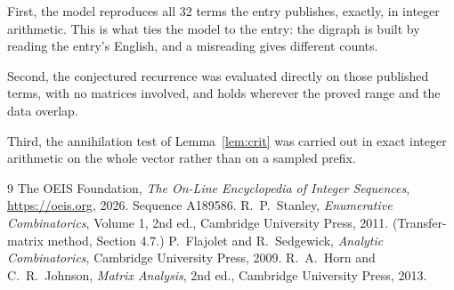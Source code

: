 \documentclass[11pt,a4paper]{article}
\theoremstyle{plain}
\theoremstyle{definition}
\begin{document}
First, the model reproduces all $32$ terms the entry publishes, exactly, in integer
arithmetic. This is what ties the model to the entry: the digraph is built by reading the
entry's English, and a misreading gives different counts.

Second, the conjectured recurrence was evaluated directly on those published terms, with no
matrices involved, and holds wherever the proved range and the data overlap.

Third, the annihilation test of Lemma~\ref{lem:crit} was carried out in exact integer
arithmetic on the whole vector rather than on a sampled prefix.

\begin{thebibliography}{9}
 The OEIS Foundation, \emph{The On-Line Encyclopedia of Integer
Sequences}, \url{https://oeis.org}, 2026. Sequence A189586.
 R.~P.~Stanley, \emph{Enumerative Combinatorics}, Volume 1, 2nd ed.,
Cambridge University Press, 2011. (Transfer-matrix method, Section 4.7.)
 P.~Flajolet and R.~Sedgewick, \emph{Analytic Combinatorics}, Cambridge
University Press, 2009.
 R.~A.~Horn and C.~R.~Johnson, \emph{Matrix Analysis}, 2nd ed., Cambridge
University Press, 2013.
\end{thebibliography}
\end{document}
